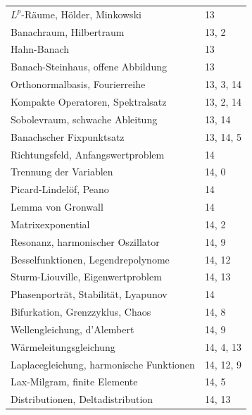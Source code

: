 {\begin{longtable}{@{}P{5.6cm}P{2.8cm}@{}}
$L^{p}$-Räume, Hölder, Minkowski & 13\\
Banachraum, Hilbertraum & 13, 2\\
Hahn-Banach & 13\\
Banach-Steinhaus, offene Abbildung & 13\\
Orthonormalbasis, Fourierreihe & 13, 3, 14\\
Kompakte Operatoren, Spektralsatz & 13, 2, 14\\
Sobolevraum, schwache Ableitung & 13, 14\\
Banachscher Fixpunktsatz & 13, 14, 5\\
Richtungsfeld, Anfangswertproblem & 14\\
Trennung der Variablen & 14, 0\\
Picard-Lindelöf, Peano & 14\\
Lemma von Gronwall & 14\\
Matrixexponential & 14, 2\\
Resonanz, harmonischer Oszillator & 14, 9\\
Besselfunktionen, Legendrepolynome & 14, 12\\
Sturm-Liouville, Eigenwertproblem & 14, 13\\
Phasenporträt, Stabilität, Lyapunov & 14\\
Bifurkation, Grenzzyklus, Chaos & 14, 8\\
Wellengleichung, d’Alembert & 14, 9\\
Wärmeleitungsgleichung & 14, 4, 13\\
Laplacegleichung, harmonische Funktionen & 14, 12, 9\\
Lax-Milgram, finite Elemente & 14, 5\\
Distributionen, Deltadistribution & 14, 13\\
\bottomrule
\end{longtable}}

